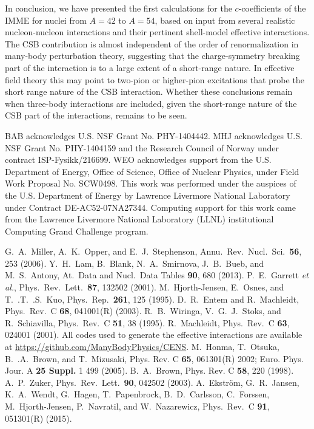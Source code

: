 \documentclass[10pt,showpacs,preprintnumbers,footinbib,amsmath,amssymb,aps,prl,twocolumn,groupedaddress,superscriptaddress,showkeys]{revtex4-1}
\begin{document}
In conclusion, we have presented the first calculations for the
$c$-coefficients of the IMME for nuclei from $A=42$ to $A=54$, based
on input from several realistic nucleon-nucleon interactions and their
pertinent shell-model effective interactions. The CSB contribution is
almost independent of the order of renormalization in many-body
perturbation theory, suggesting that the charge-symmetry breaking part
of the interaction is to a large extent of a short-range nature.  In
effective field theory this may point to two-pion or higher-pion
excitations that probe the short range nature of the CSB interaction.
Whether these conclusions remain when three-body interactions
are included, given the short-range nature of the CSB part of the
interactions, remains to be seen.



BAB acknowledges U.S. NSF Grant No. PHY-1404442. MHJ acknowledges
U.S. NSF Grant No. PHY-1404159 and the Research Council of Norway
under contract ISP-Fysikk/216699. WEO acknowledges support from the
U.S. Department of Energy, Office of Science, Office of Nuclear
Physics, under Field Work Proposal No. SCW0498. This work was
performed under the auspices of the U.S. Department of Energy by
Lawrence Livermore National Laboratory under Contract
DE-AC52-07NA27344.  Computing support for this work came from the
Lawrence Livermore National Laboratory (LLNL) institutional Computing
Grand Challenge program.

\begin{thebibliography}{99}
 G.~A.~Miller, A.~K.~Opper, and E.~J.~Stephenson, Annu.~Rev.~Nucl.~Sci.~{\bf 56}, 253 (2006).
 Y.~H.~Lam, B.~Blank, N.~A.~Smirnova, J.~B.~Bueb, and M.~S.~Antony, At.~Data and Nucl.~Data Tables {\bf 90}, 680 (2013). 
 P.~E.~Garrett {\em et al.}, Phys.~Rev.~Lett.~{\bf 87}, 132502 (2001). 
 M.~Hjorth-Jensen, E.~Osnes, and T.~.T.~.S.~Kuo, Phys.~Rep.~{\bf 261}, 125 (1995).
 D.~R.~Entem and R.~Machleidt, Phys.~Rev.~C {\bf 68}, 041001(R) (2003).
 R.~B.~Wiringa, V.~G.~J.~Stoks, and R.~Schiavilla, Phys.~Rev.~C {\bf 51}, 38 (1995).
 R.~Machleidt, Phys.~Rev.~C {\bf 63}, 024001 (2001).
 All codes used to generate the effective interactions are available at \url{ https://github.com/ManyBodyPhysics/CENS}.
 M.~Honma, T.~Otsuka, B.~.A.~Brown, and T.~Mizusaki, Phys. Rev. C {\bf 65}, 061301(R) 2002;
Euro. Phys. Jour. A {\bf 25 Suppl.} 1 499 (2005).
B.~A.~Brown, Phys. Rev. C {\bf 58}, 220 (1998).
 A.~P.~Zuker, Phys.~Rev.~Lett.~{\bf 90}, 042502 (2003).
 A.~Ekstr\"om, G.~R.~Jansen, K.~A.~Wendt, G.~Hagen, T.~Papenbrock, B.~D.~Carlsson, C.~Forssen, M.~Hjorth-Jensen, P.~Navratil, and W.~Nazarewicz, Phys.~Rev.~C {\bf 91}, 051301(R) (2015).
\end{thebibliography}
\end{document}

